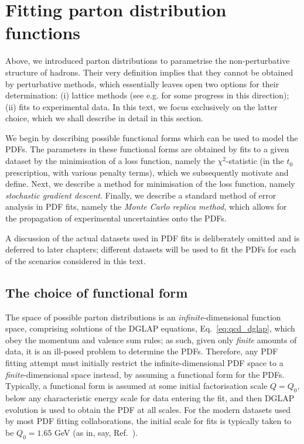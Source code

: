 \documentclass[withindex,glossary]{cam-thesis}
\begin{document}
\section{Fitting parton distribution functions}
\label{sec:pdffitting}

Above, we introduced parton distributions to parametrise the non-perturbative structure of hadrons. Their very definition implies that they cannot be obtained by perturbative methods, which essentially leaves open two options for their determination: (i) lattice methods (see e.g. \cite{Cichy:2019ebf} for some progress in this direction); (ii) fits to experimental data. In this text, we focus exclusively on the latter choice, which we shall describe in detail in this section.

We begin by describing possible functional forms which can be used to model the PDFs. The parameters in these functional forms are obtained by fits to a given dataset by the minimisation of a loss function, namely the $\chi^2$-statistic (in the $t_0$ prescription, with various penalty terms), which we subsequently motivate and define. Next, we describe a method for minimisation of the loss function, namely \textit{stochastic gradient descent}. Finally, we describe a standard method of error analysis in PDF fits, namely the \textit{Monte Carlo replica method}, which allows for the propagation of experimental uncertainties onto the PDFs. 

A discussion of the actual datasets used in PDF fits is deliberately omitted and is deferred to later chapters; different datasets will be used to fit the PDFs for each of the scenarios considered in this text.

\subsection{The choice of functional form}
The space of possible parton distributions is an \textit{infinite}-dimensional function space, comprising solutions of the DGLAP equations, Eq.~\eqref{eq:qcd_dglap}, which obey the momentum and valence sum rules; as such, given only \textit{finite} amounts of data, it is an ill-posed problem to determine the PDFs. Therefore, any PDF fitting attempt must initially restrict the infinite-dimensional PDF space to a \textit{finite}-dimensional space instead, by assuming a functional form for the PDFs. Typically, a functional form is assumed at some initial factorisation scale $Q = Q_0$, below any characteristic energy scale for data entering the fit, and then DGLAP evolution is used to obtain the PDF at all scales. For the modern datasets used by most PDF fitting collaborations, the initial scale for fits is typically taken to be $Q_0 = 1.65$ GeV (as in, say, Ref.~\cite{NNPDF:2021njg}).
\end{document}
